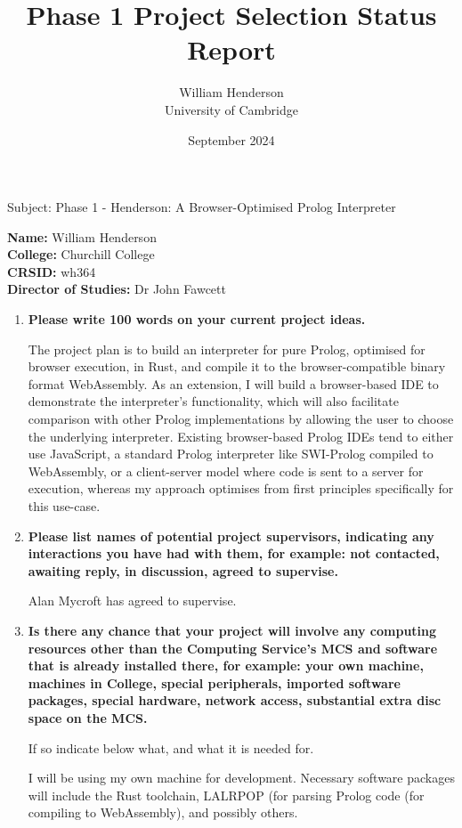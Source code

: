 \documentclass{article}
\title{Phase 1 Project Selection Status Report}
\author{William Henderson \\
University of Cambridge}
\date{September 2024}
\begin{document}
\maketitle

Subject: Phase 1 - Henderson: A Browser-Optimised Prolog Interpreter

{\bf Name:} William Henderson \\
{\bf College:} Churchill College \\
{\bf CRSID:} wh364 \\
{\bf Director of Studies:} Dr John Fawcett

\begin{enumerate}

\item {\bf Please write 100 words on your current project ideas.}

The project plan is to build an interpreter for pure Prolog, optimised for browser execution, in Rust, and compile it to the browser-compatible binary format WebAssembly. As an extension, I will build a browser-based IDE to demonstrate the interpreter’s functionality, which will also facilitate comparison with other Prolog implementations by allowing the user to choose the underlying interpreter. Existing browser-based Prolog IDEs tend to either use JavaScript, a standard Prolog interpreter like SWI-Prolog compiled to WebAssembly, or a client-server model where code is sent to a server for execution, whereas my approach optimises from first principles specifically for this use-case.

\item {\bf Please list names of potential project supervisors, indicating any interactions you have had with them, for example: not contacted, awaiting reply, in discussion, agreed to supervise.}

Alan Mycroft has agreed to supervise.

\item {\bf Is there any chance that your project will involve any computing resources other than the Computing Service's MCS and software that is already installed there, for example: your own machine, machines in College, special peripherals, imported software packages, special hardware, network access, substantial extra disc space on the MCS.

If so indicate below what, and what it is needed for.}

I will be using my own machine for development. Necessary software packages will include the Rust toolchain, LALRPOP (for parsing Prolog code (for compiling to WebAssembly), and possibly others.

\end{enumerate}
\end{document}
